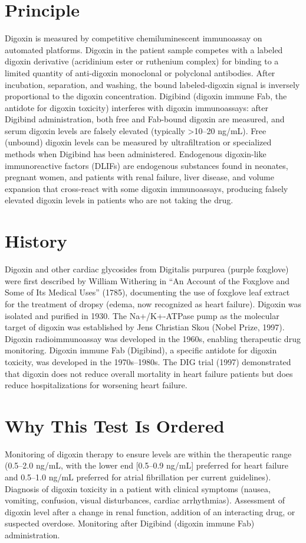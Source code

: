 \section*{Principle}
Digoxin is measured by competitive chemiluminescent immunoassay on automated platforms. Digoxin in the patient sample competes with a labeled digoxin derivative (acridinium ester or ruthenium complex) for binding to a limited quantity of anti-digoxin monoclonal or polyclonal antibodies. After incubation, separation, and washing, the bound labeled-digoxin signal is inversely proportional to the digoxin concentration. Digibind (digoxin immune Fab, the antidote for digoxin toxicity) interferes with digoxin immunoassays: after Digibind administration, both free and Fab-bound digoxin are measured, and serum digoxin levels are falsely elevated (typically >10--20 ng/mL). Free (unbound) digoxin levels can be measured by ultrafiltration or specialized methods when Digibind has been administered. Endogenous digoxin-like immunoreactive factors (DLIFs) are endogenous substances found in neonates, pregnant women, and patients with renal failure, liver disease, and volume expansion that cross-react with some digoxin immunoassays, producing falsely elevated digoxin levels in patients who are not taking the drug.

\section*{History}
Digoxin and other cardiac glycosides from Digitalis purpurea (purple foxglove) were first described by William Withering in ``An Account of the Foxglove and Some of Its Medical Uses'' (1785), documenting the use of foxglove leaf extract for the treatment of dropsy (edema, now recognized as heart failure). Digoxin was isolated and purified in 1930. The Na+/K+-ATPase pump as the molecular target of digoxin was established by Jens Christian Skou (Nobel Prize, 1997). Digoxin radioimmunoassay was developed in the 1960s, enabling therapeutic drug monitoring. Digoxin immune Fab (Digibind), a specific antidote for digoxin toxicity, was developed in the 1970s--1980s. The DIG trial (1997) demonstrated that digoxin does not reduce overall mortality in heart failure patients but does reduce hospitalizations for worsening heart failure.

\section*{Why This Test Is Ordered}
Monitoring of digoxin therapy to ensure levels are within the therapeutic range (0.5--2.0 ng/mL, with the lower end [0.5--0.9 ng/mL] preferred for heart failure and 0.5--1.0 ng/mL preferred for atrial fibrillation per current guidelines). Diagnosis of digoxin toxicity in a patient with clinical symptoms (nausea, vomiting, confusion, visual disturbances, cardiac arrhythmias). Assessment of digoxin level after a change in renal function, addition of an interacting drug, or suspected overdose. Monitoring after Digibind (digoxin immune Fab) administration.

